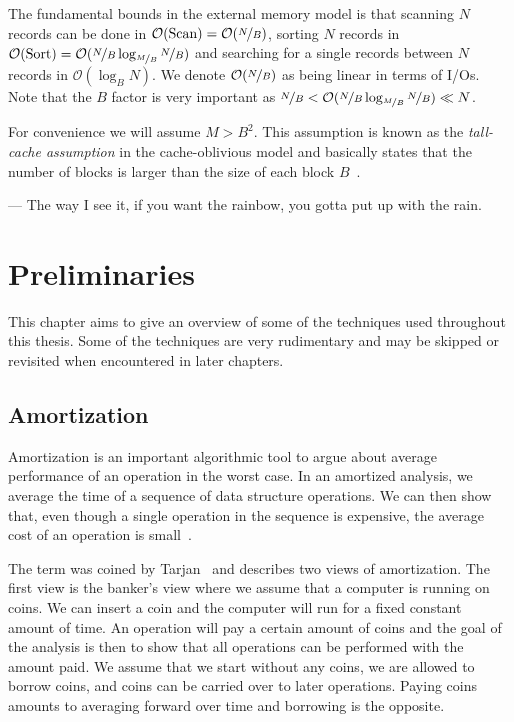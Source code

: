 \documentclass[twoside,11pt,openright]{report}
\begin{document}
The fundamental bounds in the external memory model is that scanning $N$ records can be done in $\mathcal{O}(\text{Scan}) = \mathcal{O}(\nicefrac{N}{B})$, sorting $N$ records in $\mathcal{O}(\text{Sort}) = \mathcal{O}(\nicefrac{N}{B} \log_{\nicefrac{M}{B}}\nicefrac{N}{B})$ and searching for a single records between $N$ records in $\mathcal{O}(\log_B N)$. We denote $\mathcal{O}(\nicefrac{N}{B})$ as being linear in terms of I/Os. Note that the $B$ factor is very important as $\nicefrac{N}{B} < \mathcal{O}(\nicefrac{N}{B} \log_{\nicefrac{M}{B}}\nicefrac{N}{B}) \ll N$.

For convenience we will assume $M > B^2$. This assumption is known as the \textit{tall-cache assumption} in the cache-oblivious model and basically states that the number of blocks  is larger than the size of each block $B$~\cite{Prokop99cache-obliviousalgorithms}.

\begin{savequote}[0.5\textwidth]
--- The way I see it, if you want the rainbow, you gotta put up with the rain.
\end{savequote}
\chapter{Preliminaries}
\label{chp:prelims}
This chapter aims to give an overview of some of the techniques used throughout this thesis. Some of the techniques are very rudimentary and may be skipped or revisited when encountered in later chapters.

\section{Amortization}
Amortization is an important algorithmic tool to argue about average performance of an operation in the worst case.
In an amortized analysis, we average the time of a sequence of data structure operations. We can then show that, even though a single operation in the sequence is expensive, the average cost of an operation is small~\cite[p.~451-452]{clrs}.

The term was coined by Tarjan~\cite{Tarjan85} and describes two views of amortization. The first view is the banker's view where we assume that a computer is running on coins. We can insert a coin and the computer will run for a fixed constant amount of time. An operation will pay a certain amount of coins and the goal of the analysis is then to show that all operations can be performed with the amount paid. We assume that we start without any coins, we are allowed to borrow coins, and coins can be carried over to later operations. Paying coins amounts to averaging forward over time and borrowing is the opposite.
\end{document}
